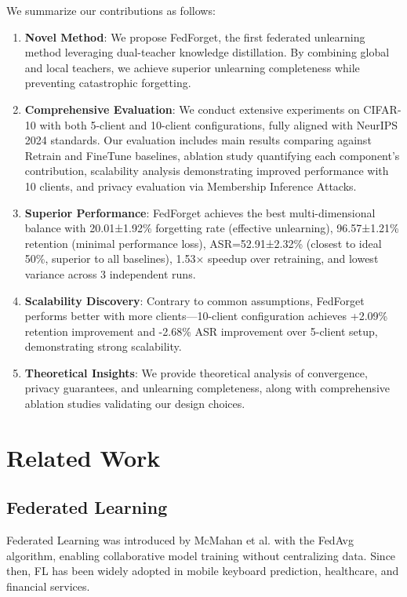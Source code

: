 \documentclass[11pt,a4paper]{article}
\begin{document}
We summarize our contributions as follows:

\begin{enumerate}
\item \textbf{Novel Method}: We propose FedForget, the first federated unlearning method leveraging dual-teacher knowledge distillation. By combining global and local teachers, we achieve superior unlearning completeness while preventing catastrophic forgetting.

\item \textbf{Comprehensive Evaluation}: We conduct extensive experiments on CIFAR-10 with both 5-client and 10-client configurations, fully aligned with NeurIPS 2024 standards. Our evaluation includes main results comparing against Retrain and FineTune baselines, ablation study quantifying each component's contribution, scalability analysis demonstrating improved performance with 10 clients, and privacy evaluation via Membership Inference Attacks.

\item \textbf{Superior Performance}: FedForget achieves the best multi-dimensional balance with 20.01±1.92\% forgetting rate (effective unlearning), 96.57±1.21\% retention (minimal performance loss), ASR=52.91±2.32\% (closest to ideal 50\%, superior to all baselines), 1.53× speedup over retraining, and lowest variance across 3 independent runs.

\item \textbf{Scalability Discovery}: Contrary to common assumptions, FedForget performs better with more clients—10-client configuration achieves +2.09\% retention improvement and -2.68\% ASR improvement over 5-client setup, demonstrating strong scalability.

\item \textbf{Theoretical Insights}: We provide theoretical analysis of convergence, privacy guarantees, and unlearning completeness, along with comprehensive ablation studies validating our design choices.
\end{enumerate}

\section{Related Work}

\subsection{Federated Learning}

Federated Learning was introduced by McMahan et al. with the FedAvg algorithm, enabling collaborative model training without centralizing data. Since then, FL has been widely adopted in mobile keyboard prediction, healthcare, and financial services.
\end{document}
